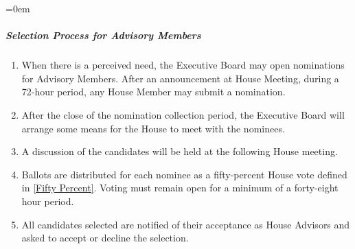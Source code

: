 \documentclass{article}
\newcommand{\asubsubsubsection}[1]{\parindent=0em\subparagraph{#1} \label{#1}}
\begin{document}
\asubsubsubsection{Selection Process for Advisory Members}
\begin{enumerate}
	\item When there is a perceived need, the Executive Board may open nominations for Advisory Members.
		After an announcement at House Meeting, during a 72-hour period, any House Member may submit a nomination.
	\item After the close of the nomination collection period, the Executive Board will arrange some means for the House to meet with the nominees.
	\item A discussion of the candidates will be held at the following House meeting.
	\item Ballots are distributed for each nominee as a fifty-percent House vote defined in \ref{Fifty Percent}.
		Voting must remain open for a minimum of a forty-eight hour period.
	\item All candidates selected are notified of their acceptance as House Advisors and asked to accept or decline the selection.
\end{enumerate}
\end{document}
